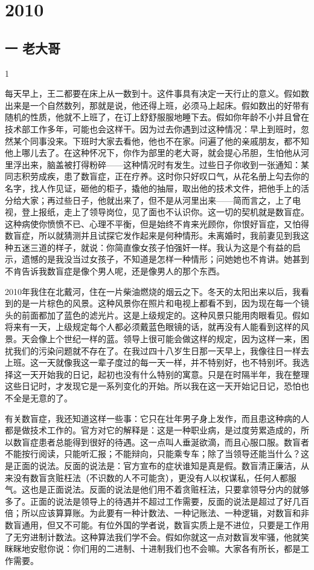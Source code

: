 \chapter{2010}

\section{一 老大哥}

1 

每天早上，王二都要在床上从一数到十。这件事具有决定一天行止的意义。假如数出来是一个自然数列，那就是说，他还得上班，必须马上起床。假如数出的好带有随机的性质，他就不上班了，在订上舒舒服服地睡下去。假如你年龄不小并且曾在技术部工作多年，可能也会这样干。因为过去你遇到过这种情况：早上到班时，忽然某个同事没来。下班时大家去看他，他也不在家。问遍了他的亲戚朋友，都不知他上哪儿去了。在这种怀况下，你作为部里的老大哥，就会提心吊胆，生怕他从河里浮出来，脑盖被打得粉碎——这种情况时有发生。过些日子你收到一张通知：某同志积劳成疾，患了数盲症，正在疗养。这时你只好叹口气，从花名册上勾去你的名字，找人作见证，砸他的柜子，撬他的抽屉，取出他的技术文件，把他手上的活分给大家；再过些日子，他就出来了，但不是从河里出来——简而言之，上了电视，登上报纸，走上了领导岗位，见了面也不认识你。这一切的契机就是数盲症。这种病使你愤愤不已、心理不平衡，但是始终不肯来光顾你，你恨好盲症，又怕得数盲症，所以就猜测并且试探它发作起来是何种情形。未离婚时，我前妻见到我这种五迷三道的样子，就说：你简直像女孩子怕强奸一样。我认为这是个有益的启示，遗憾的是我没当过女孩子，不知道是怎样一种情形；问她她也不肯讲。她甚到不肯告诉我数盲症是像个男人呢，还是像男人的那个东西。 

2010年我住在北戴河，住在一片柴油燃烧的烟云之下。冬天的太阳出来以后，我看到的是一片棕色的风景。这种风景你在照片和电视上都看不到，因为现在每一个镜头的前面都加了蓝色的滤光片。这是上级规定的。这种风景只能用肉眼看见。假如将来有一天，上级规定每个人都必须戴蓝色眼镜的话，就再没有人能看到这样的风景。天会像上个世纪一样的蓝。领导上很可能会做这样的规定，因为这样一来，困扰我们的污染问题就不存在了。在我过四十八岁生日那一天早上，我像往日一样去上班。这一天就像我这一辈子度过的每一天一样，并不特别好，也不特别坏。我选择这一天开始我的日记，起初也没有什么特别的寓意。只是在时隔半年，我在整理这些日记时，才发现它是一系列变化的开始。所以我在这一天开始记日记，恐怕也不全是无意的了。 

有关数盲症，我还知道这样一些事：它只在壮年男子身上发作，而且患这种病的人都是做技术工作的。官方对它的解释是：这是一种职业病，是过度劳累造成的，所以数盲症患者总能得到很好的待遇。这一点叫人垂涎欲滴，而且心服口服。数盲者不能按行阅读，只能听汇报；不能辩向，只能乘专车；除了当领导还能当什么？这是正面的说法。反面的说法是：官方宣布的症状谁知是真是假。数盲清正廉洁，从来没有数盲贪赃枉法（不识数的人不可能贪），更没有人以权谋私，任何人都服气。这也是正面说法。反面的说法是他们用不着贪赃枉法，只要拿领导分内的就够多了。正面的说法是领导上的待遇并不超过工作需要，反面的说法是超过了好几百倍；所以应该算算账。为此要有一种计数法、一种记账法、一种逻辑，对数盲和非数盲通用，但又不可能。有位外国的学者说，数盲实质上是不进位，只要是工作用了无穷进制计数法。这种算法我们学不会。假如你就这一点对数盲发牢骚，他就笑眯眯地安慰你说：你们用的二进制、十进制我们也不会嘛。大家各有所长，都是工作需要。 



